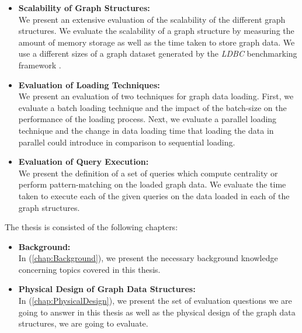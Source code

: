 {\begin{itemize}
\item \textbf{Scalability of Graph Structures:}\\
We present an extensive evaluation of the scalability of the different graph structures. We evaluate the scalability of a graph structure by measuring the amount of memory storage as well as the time taken to store graph data. We use a different sizes of a graph dataset generated by the \textit{LDBC} benchmarking framework \cite{boncz2013ldbc}.\\

\item \textbf{Evaluation of Loading Techniques:}\\
We present an evaluation of two techniques for graph data loading. First, we evaluate a batch loading technique and the impact of the batch-size on the performance of the loading process. Next, we evaluate a parallel loading technique and the change in data loading time that loading the data in parallel could introduce in comparison to sequential loading.\\

\item \textbf{Evaluation of Query Execution:}\\
We present the definition of a set of queries which compute centrality or perform pattern-matching on the loaded graph data. We evaluate the time taken to execute each of the given queries on the data loaded in each of the graph structures.

\end{itemize}



The thesis is consisted of the following chapters: 

\begin{itemize}  
\item\textbf{Background:}\\
In (\ref{chap:Background}), we present the necessary background knowledge concerning topics covered in this thesis.

\item \textbf{Physical Design of Graph Data Structures:}\\
In (\ref{chap:PhysicalDesign}), we present the set of evaluation questions we are going to answer in this thesis as well as the physical design of the graph data structures, we are going to evaluate.


\end{itemize}}
